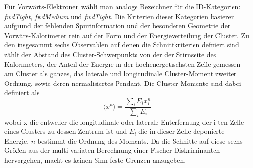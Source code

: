 Für Vorwärts-Elektronen wählt man analoge Bezeichner für die ID-Kategorien:
\textit{fwdTight}, \textit{fwdMedium} und \textit{fwdTight}. Die Kriterien
dieser Kategorien basieren aufgrund der fehlenden Spurinformation und der
besonderen Geometrie der Vorwärs-Kalorimeter rein auf der Form und der
Energieverteilung der Cluster. Zu den insgesammt sechs Observablen auf denen
die Schnittkriterien defniert sind zählt der Abstand des Cluster-Schwerpunkts
von der der Stirnseite des Kalorimeters, der Anteil der Energie in der
hochenergetischsten Zelle gemessen am Cluster als ganzes, das laterale und
longitudinale Cluster-Moment zweiter Ordnung, sowie deren normalisiertes
Pendant. Die Cluster-Momente sind dabei definiert als
\begin{equation}
    \langle x^n \rangle = \frac{\sum_i E_i x_i^n}{\sum_i E_i}
\end{equation}
wobei x die entweder die longitudinale oder laterale Enterfernung der i-ten
Zelle eines Clusters zu dessen Zentrum ist und $E_i$ die in dieser Zelle
deponierte Energie. $n$ bestimmt die Ordnung des Moments. Da die Schnitte auf
diese sechs Größen aus der multi-variaten Berechnung einer
Fischer-Diskriminanten hervorgehen, macht es keinen Sinn feste Grenzen
anzugeben.

